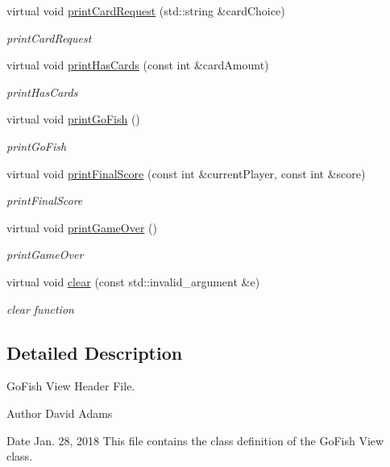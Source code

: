 \begin{DoxyCompactItemize}
virtual void \hyperlink{classGoFishView_aa415293cadd4dadaae3134284462dee5}{print\-Card\-Request} (std\-::string \&card\-Choice)
\begin{DoxyCompactList}\small\item\em print\-Card\-Request \end{DoxyCompactList}\item 
virtual void \hyperlink{classGoFishView_a3de3be99376159d07a1c879df14129ef}{print\-Has\-Cards} (const int \&card\-Amount)
\begin{DoxyCompactList}\small\item\em print\-Has\-Cards \end{DoxyCompactList}\item 
virtual void \hyperlink{classGoFishView_a116b5cb1c53c19bb384515f0b0f12e70}{print\-Go\-Fish} ()
\begin{DoxyCompactList}\small\item\em print\-Go\-Fish \end{DoxyCompactList}\item 
virtual void \hyperlink{classGoFishView_aa70eae88e454a52123db9259f15d0580}{print\-Final\-Score} (const int \&current\-Player, const int \&score)
\begin{DoxyCompactList}\small\item\em print\-Final\-Score \end{DoxyCompactList}\item 
virtual void \hyperlink{classGoFishView_aa11d8efd4a5667439080fd410a9c8271}{print\-Game\-Over} ()
\begin{DoxyCompactList}\small\item\em print\-Game\-Over \end{DoxyCompactList}\item 
virtual void \hyperlink{classGoFishView_ae57a41bcb8d566404036162da199099d}{clear} (const std\-::invalid\-\_\-argument \&e)
\begin{DoxyCompactList}\small\item\em clear function \end{DoxyCompactList}\end{DoxyCompactItemize}


\subsection{Detailed Description}
Go\-Fish View Header File. 

\begin{DoxyAuthor}{Author}
David Adams 
\end{DoxyAuthor}
\begin{DoxyDate}{Date}
Jan. 28, 2018 This file contains the class definition of the Go\-Fish View class. 
\end{DoxyDate}


